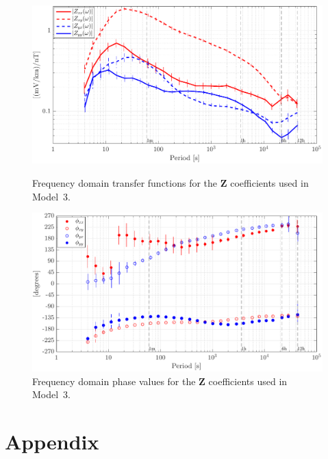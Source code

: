 \documentclass[draft,linenumbers]{agujournal2018}
\begin{document}
\begin{figure}[h]
\centering
\includegraphics[width=\textwidth]{figures/plot_model_summary_Z_MT-options-1.pdf}
\caption{Frequency domain transfer functions for the $\mathbf{Z}$ coefficients used in Model~3.}
\label{Z_MT}

\vspace{4em}

\centering
\includegraphics[width=\textwidth]{figures/plot_model_summary_Phi_MT-options-1.pdf}
\caption{Frequency domain phase values for the $\mathbf{Z}$ coefficients used in Model~3.}
\label{Phi_MT}
\end{figure}

\clearpage

\section{Appendix}

\setcounter{table}{0}
\renewcommand{\thetable}{A\arabic{table}}
\end{document}
